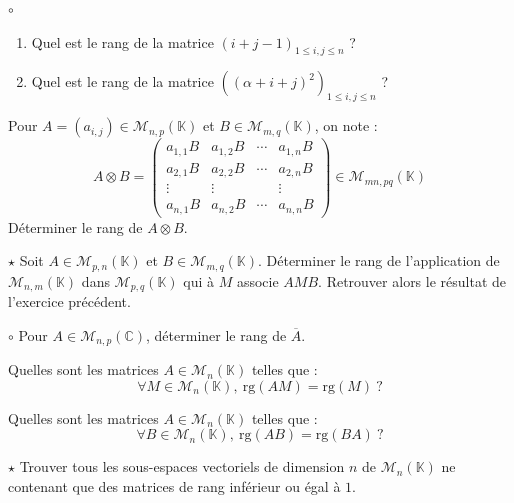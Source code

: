 \documentclass[french,a4paper]{article}
\newcommand{\C}{\mathbb{C}}
\newcommand{\K}{\mathbb{K}}
\theoremstyle{plain}
\theoremstyle{definition}
\theoremstyle{remark}
\begin{document}
\begin{ex}{$\circ$}
	\begin{enumerate}
		\item Quel est le rang de la matrice $(i+j-1)_{1\leqslant i,j\leqslant n}$ ?
		\item Quel est le rang de la matrice $((\alpha+i+j)^2)_{1\leqslant i,j\leqslant n}$ ?
	\end{enumerate}
\end{ex}

\begin{ex}{}
	Pour $A=(a_{i,j})\in\mathcal{M}_{n,p}(\K)$ et $B\in\mathcal{M}_{m,q}(\K)$, on note : $$A\otimes B=\begin{pmatrix}
		a_{1,1}B&a_{1,2}B&\cdots&a_{1,n}B\\
		a_{2,1}B&a_{2,2}B&\cdots&a_{2,n}B\\
		\vdots&\vdots&&\vdots\\
		a_{n,1}B&a_{n,2}B&\cdots&a_{n,n}B
	\end{pmatrix}\in\mathcal{M}_{mn,pq}(\K)$$
	Déterminer le rang de $A\otimes B$.
\end{ex}

\begin{ex}{$\star$}
	Soit $A\in\mathcal{M}_{p,n}(\K)$ et $B\in\mathcal{M}_{m,q}(\K)$. Déterminer le rang de l'application de $\mathcal{M}_{n,m}(\K)$ dans $\mathcal{M}_{p,q}(\K)$ qui à $M$ associe $AMB$. Retrouver alors le résultat de l'exercice précédent.
\end{ex}

\begin{ex}{$\circ$}
	Pour $A\in\mathcal{M}_{n,p}(\C)$, déterminer le rang de $\overline{A}$.
\end{ex}

\begin{ex}{}
	Quelles sont les matrices $A\in\mathcal{M}_n(\K)$ telles que : $$\forall M\in\mathcal{M}_n(\K),\ \text{rg}(AM)=\text{rg}(M)\ ?$$
\end{ex}

\begin{ex}{}
	Quelles sont les matrices $A\in\mathcal{M}_n(\K)$ telles que : $$\forall B\in\mathcal{M}_n(\K),\ \text{rg}(AB)=\text{rg}(BA)\ ?$$
\end{ex}

\begin{ex}{$\star$}
	Trouver tous les sous-espaces vectoriels de dimension $n$ de $\mathcal{M}_n(\K)$ ne contenant que des matrices de rang inférieur ou égal à $1$.
\end{ex}
\end{document}
